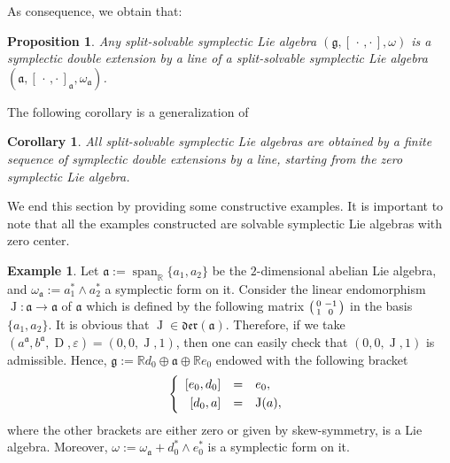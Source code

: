 \documentclass[final,1p,times,nopreprintline]{elsarticle}
\newtheorem{proposition}{Proposition}[section]
\newtheorem{corollary}{Corollary}[section]
\theoremstyle{definition}
\newtheorem{example}{Example}[section]
\numberwithin{equation}{section}
\newcommand{\rel}{\mathbb{R}}
\newcommand{\w}{\omega}
\newcommand{\g}{\mathfrak{g}}
\newcommand{\ai}{\mathfrak{a}}
\newcommand{\Span}{\operatorname{span}}
\newcommand{\J}{\operatorname{J}}
\numberwithin{equation}{section}
\newcommand{\D}{\operatorname{D}}
\newcommand{\cro}{[\,\cdot\,,\cdot\,]}
\begin{document}
As consequence, we obtain that:

\begin{proposition}
Any split-solvable symplectic Lie algebra $(\g,\cro,\w)$ is a symplectic double extension by a line of a split-solvable symplectic Lie algebra $(\ai,\cro_\ai,\w_\ai)$.
\end{proposition}

The following corollary is a generalization of \cite[Theorem $3.1$, p. 220]{DM}
\begin{corollary}
All split-solvable symplectic Lie algebras are obtained by a finite sequence of symplectic double extensions by a line, starting from the zero symplectic Lie algebra.
\end{corollary}

We end this section by providing some constructive examples. It is important to note that all the examples constructed are solvable symplectic Lie algebras with zero center.

\begin{example}
	Let $\ai:=\Span_\rel\{a_1,a_2\}$ be the $2$-dimensional abelian Lie algebra, and $\w_\ai:=a_1^*\wedge a_2^*$ a symplectic form on it. Consider the linear endomorphism $\J:\ai\to\ai$ of $\ai$ which is defined by the following matrix $\begin{psmallmatrix}
		0&-1\\
		1&0
	\end{psmallmatrix}$ in the basis $\{a_1,a_2\}$. It is obvious that $\J\in\mathfrak{der}(\ai)$. Therefore, if we take $(a^\ai,b^\ai,\D,\varepsilon)=(0,0,\J,1)$, then one can easily check that $(0,0,\J,1)$ is admissible. Hence, $\g:=\rel d_0\oplus\ai\oplus\rel e_0$ endowed with the following bracket
	\begin{equation*}
		\left\{
		\begin{array}{r c l}\vspace{1mm}
			\left[e_0,d_0\right]&=&e_0,\\
			\left[d_0,a\right]&=&\J(a),
		\end{array}
		\right.\\
	\end{equation*}
	where the other brackets are either zero or given by skew-symmetry, is a Lie algebra. Moreover, $\w:=\w_\ai+d_0^*\wedge e_0^*$ is a symplectic form on it.
\end{example}
\end{document}

